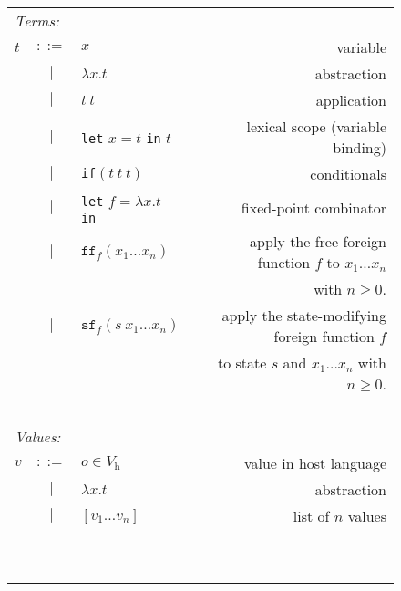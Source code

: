 \begin{figure}[p]
    \begin{tabular}{l c l r}
        \multicolumn{4}{l}{\emph{Terms:}}\\
        $t$ & $::=$ & $x$ & variable\\
        & $|$ & $\lambda x.t$ & abstraction\\
        & $|$ & $t\ t$ & application\\
        & $|$ & \texttt{let} $x = t$ \texttt{in} $t$ & lexical scope (variable binding)\\
        & $|$ & \texttt{if}$(t\ t\ t)$ & conditionals\\
        & $|$ & \texttt{let} $f = \lambda x.t$ \texttt{in} & fixed-point combinator\\
        & $|$ & $\texttt{ff}_f (x_1 \dots x_n)$ & apply the free foreign function $f$ to $x_1 \dots x_n$\\
        &&& with $n \geq 0$.\\
        & $|$ & $\texttt{sf}_f (s\ x_1 \dots x_n)$ & apply the state-modifying foreign function $f$\\
        &&& to state $s$ and $x_1 \dots x_n$ with $n \geq 0$.\\\ \\
    
        \multicolumn{4}{l}{\emph{Values:}}\\
        $v$ & $::=$ & $o \in V_\text{h}$ & value in host language\\
        & $|$ & $\lambda x.t$ & abstraction\\
        & $|$ & $[ v_1 \dots v_n ]$ & list of $n$ values\\\ \\ \
    \end{tabular}
    

\end{figure}
